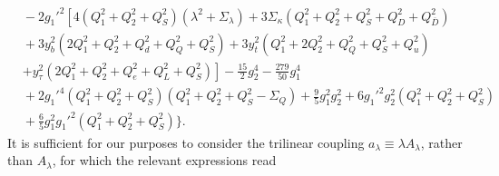 \documentclass[preprint,amsmath,amssymb,aps,superscriptaddress,prd,showpacs,floatfix,nofootinbib]{revtex4-1}
\begin{document}
\begin{subequations}
\begin{align}
&{}-2g_1'^2\left [ 4\left ( Q_1^2+Q_2^2+Q_S^2\right )\left ( \lambda^2 +\Sigma_\lambda \right )+3\Sigma_\kappa\left ( Q_1^2+Q_2^2+Q_S^2+Q_D^2+Q_{\overline{D}}^2\right )\right .\nonumber\\
&{}+3y_b^2\left ( 2Q_1^2+Q_2^2+Q_d^2+Q_Q^2+Q_S^2 \right )+3y_t^2\left ( Q_1^2+2Q_2^2+Q_Q^2+Q_S^2+Q_u^2\right )\nonumber\\
&{}\left.+y_\tau^2\left ( 2Q_1^2+Q_2^2+Q_e^2+Q_L^2+Q_S^2\right )\right ]-\frac{15}{2}g_2^4-\frac{279}{50}g_1^4\nonumber\\
&{}+2g_1'^4\left ( Q_1^2+Q_2^2+Q_S^2 \right )\left (Q_1^2+Q_2^2+Q_S^2-\Sigma_{Q}\right )+\frac{9}{5}g_1^2g_2^2+6g_1'^2g_2^2\left ( Q_1^2+Q_2^2+Q_S^2\right )\nonumber\\
&{}+\frac{6}{5}g_1^2g_1'^2\left ( Q_1^2+Q_2^2+Q_S^2 \right ) \bigg \}.\label{eq:USSMLambdaOt2Coeff}
\end{align}
\end{subequations}
It is sufficient for our purposes to consider the trilinear coupling $a_\lambda\equiv \lambda A_\lambda$, rather than $A_\lambda$, for which the relevant expressions read
\end{document}

